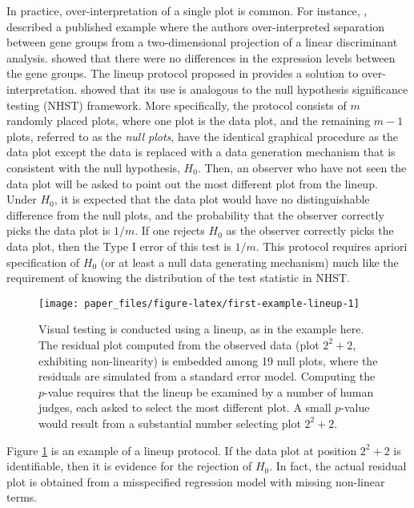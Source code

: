 \documentclass[]{interact}
\theoremstyle{plain}%
\theoremstyle{definition}
\theoremstyle{remark}
\begin{document}
In practice, over-interpretation of a single plot is common. For
instance, \citet{roy_chowdhury_using_2015}, described a published
example where the authors over-interpreted separation between gene
groups from a two-dimensional projection of a linear discriminant
analysis. \citet{roy_chowdhury_using_2015} showed that there were no
differences in the expression levels between the gene groups. The lineup
protocol proposed in \citet{buja_statistical_2009} provides a solution
to over-interpretation. \citet{majumder_validation_2013} showed that its
use is analogous to the null hypothesis significance testing (NHST)
framework. More specifically, the protocol consists of \(m\) randomly
placed plots, where one plot is the data plot, and the remaining
\(m - 1\) plots, referred to as the \emph{null plots}, have the
identical graphical procedure as the data plot except the data is
replaced with a data generation mechanism that is consistent with the
null hypothesis, \(H_0\). Then, an observer who have not seen the data
plot will be asked to point out the most different plot from the lineup.
Under \(H_0\), it is expected that the data plot would have no
distinguishable difference from the null plots, and the probability that
the observer correctly picks the data plot is \(1/m\). If one rejects
\(H_0\) as the observer correctly picks the data plot, then the Type I
error of this test is \(1/m\). This protocol requires apriori
specification of \(H_0\) (or at least a null data generating mechanism)
much like the requirement of knowing the distribution of the test
statistic in NHST.

\begin{figure}[t!]

{\centering \texttt{[image: paper\_files/figure-latex/first-example-lineup-1]} 

}

\caption{Visual testing is conducted using a lineup, as in the example here. The residual plot computed from the observed data (plot $2^2 + 2$, exhibiting non-linearity) is embedded among 19 null plots, where the residuals are simulated from a standard error model. Computing the $p$-value requires that the lineup be examined by a number of human judges, each asked to select the most different plot. A small $p$-value would result from a substantial number selecting plot $2^2 + 2$.}\label{fig:first-example-lineup}
\end{figure}

Figure \ref{fig:first-example-lineup} is an example of a lineup
protocol. If the data plot at position \(2^2 + 2\) is identifiable, then
it is evidence for the rejection of \(H_0\). In fact, the actual
residual plot is obtained from a misspecified regression model with
missing non-linear terms.
\end{document}

